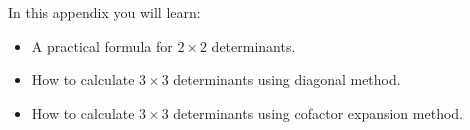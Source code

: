 \begin{appendix}
	In this appendix you will learn:
\begin{itemize}
  \item A practical formula for $2\times 2$ determinants.
  \item How to calculate $3\times 3$ determinants using diagonal method.
  \item How to calculate $3\times 3$ determinants using cofactor expansion method.
\end{itemize}



\end{appendix}

\begin{bookonly}


\end{bookonly}
